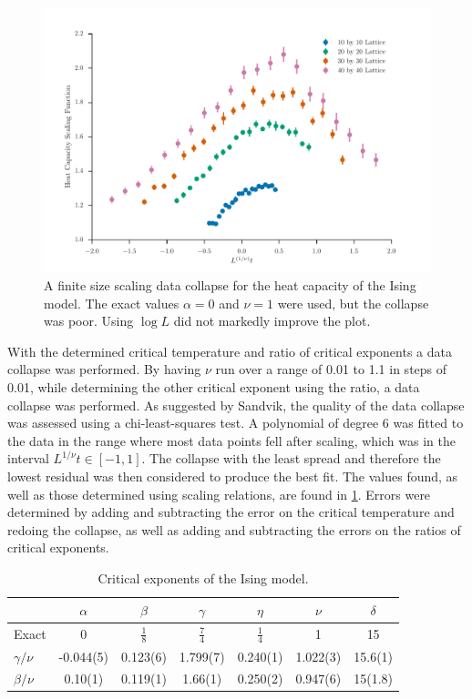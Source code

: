 \documentclass[11pt, a4paper]{report} %
\begin{document}
\begin{figure}[htb]
	\includegraphics[width=\linewidth]{ising_heat_capacity_data_collapse.pdf}
	\caption{A finite size scaling data collapse for the heat capacity of the Ising model. The exact values \(\alpha=0\) and \(\nu=1\) were used, but the collapse was poor. Using \(\log{L}\) did not markedly improve the plot.}
	\label{fig:ising_heat_capacity_collapse}
\end{figure}


With the determined critical temperature and ratio of critical exponents a data collapse was performed.
By having \(\nu\) run over a range of 0.01 to 1.1 in steps of 0.01, while determining the other critical exponent using the ratio, a data collapse was performed.
As suggested by Sandvik\cite{sandvik:2011}, the quality of the data collapse was assessed using a chi-least-squares test.
A polynomial of degree 6 was fitted to the data in the range where most data points fell after scaling, which was in the interval \(L^{1/\nu}t \in [-1, 1]\).
The collapse with the least spread and therefore the lowest residual was then considered to produce the best fit.
The values found, as well as those determined using scaling relations, are found in \cref{tab:ising_critical_exponents}.
Errors were determined by adding and subtracting the error on the critical temperature and redoing the collapse, as well as adding and subtracting the errors on the ratios of critical exponents.

\begin{table}[htb]
	\centering
	\renewcommand{\arraystretch}{1.5}
	\begin{tabular}{l | c c c c c c}
		\hline
		& \(\alpha\) & \(\beta\) & \(\gamma\) & \(\eta\) & \(\nu\) & \(\delta\) \\\hline
		Exact & 0 & \(\frac{1}{8}\) & \(\frac{7}{4}\) & \(\frac{1}{4}\) & 1 & 15 \\
		\(\gamma/\nu\) & -0.044(5) & 0.123(6) & 1.799(7) & 0.240(1) & 1.022(3) & 15.6(1) \\
		\(\beta/\nu\) & 0.10(1) & 0.119(1) & 1.66(1) & 0.250(2) & 0.947(6) & 15(1.8)\\\hline
	\end{tabular}
	\caption{Critical exponents of the Ising model.}
	\label{tab:ising_critical_exponents}
\end{table}
\end{document}
